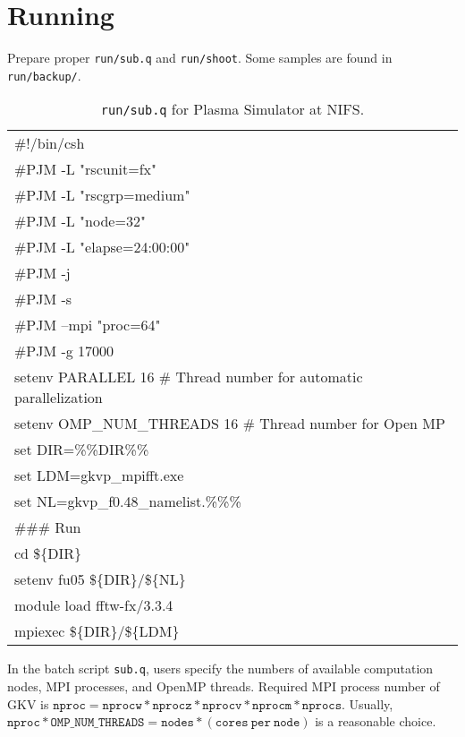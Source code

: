 \section{Running}
\label{sec:Running}
Prepare proper \texttt{run/sub.q} and \texttt{run/shoot}. Some samples are found in \texttt{run/backup/}. \\

\begin{table}[tb!]
  \caption{\texttt{run/sub.q} for Plasma Simulator at NIFS.}
  \centering
  \begin{tabular}{| l |}
  \hline
  \#!/bin/csh\\
  \#PJM -L "rscunit=fx"\\
  \#PJM -L "rscgrp=medium"\\
  \#PJM -L "node=32"\\
  \#PJM -L "elapse=24:00:00"\\
  \#PJM -j\\
  \#PJM -s\\
  \#PJM --mpi "proc=64"\\
  \#PJM -g 17000\\
  setenv PARALLEL 16          \# Thread number for automatic parallelization\\
  setenv OMP\_NUM\_THREADS 16   \# Thread number for Open MP\\
  set DIR=\%\%DIR\%\%\\
  set LDM=gkvp\_mpifft.exe\\
  set NL=gkvp\_f0.48\_namelist.\%\%\%\\
  \#\#\# Run\\
  cd \$\{DIR\}\\
  setenv fu05 \$\{DIR\}/\$\{NL\}\\
  module load fftw-fx/3.3.4\\
  mpiexec \$\{DIR\}/\$\{LDM\}\\
  \hline
  \end{tabular}
\end{table}
In the batch script \texttt{sub.q}, users specify the numbers of available computation nodes, MPI processes, and OpenMP threads. Required MPI process number of GKV is $\mathtt{nproc} = \mathtt{nprocw}*\mathtt{nprocz}*\mathtt{nprocv}*\mathtt{nprocm}*\mathtt{nprocs}$. Usually, $\mathtt{nproc}*\mathtt{OMP\_NUM\_THREADS} = \mathtt{nodes}*(\mathtt{cores~per~node})$ is a reasonable choice.\\

